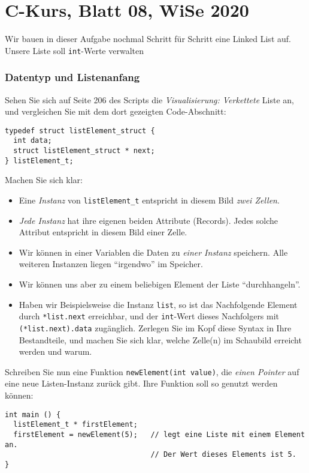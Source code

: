 \documentclass[
	ngerman,
	fontsize=10pt,
	parskip=half,
	titlepage=true,
	DIV=12
]{scrartcl}
\newcommand*{\inC}[1]{\texttt{#1}}
\begin{document}
\part*{C-Kurs, Blatt 08, WiSe 2020}

Wir bauen in dieser Aufgabe nochmal Schritt für Schritt eine Linked List auf. Unsere Liste soll \inC{int}-Werte verwalten

\section{Datentyp und Listenanfang}
Sehen Sie sich auf Seite 206 des Scripts die \emph{Visualisierung: Verkettete} Liste an, und vergleichen Sie mit dem dort gezeigten Code-Abschnitt:
\begin{verbatim}
typedef struct listElement_struct {
  int data;
  struct listElement_struct * next;
} listElement_t;
\end{verbatim}

Machen Sie sich klar:
\begin{itemize}
\item Eine \emph{Instanz} von \texttt{listElement\_t} entspricht in diesem Bild \emph{zwei Zellen}.
\item \emph{Jede Instanz} hat ihre eigenen beiden Attribute (Records). Jedes solche Attribut entspricht in diesem Bild einer Zelle.
\item Wir können in einer Variablen die Daten zu \emph{einer Instanz} speichern. Alle weiteren Instanzen liegen \enquote{irgendwo} im Speicher.
\item Wir können uns aber zu einem beliebigen Element der Liste \enquote{durchhangeln}.
\item Haben wir Beispielsweise die Instanz \texttt{list}, so ist das Nachfolgende Element durch \texttt{*list.next} erreichbar, und der \inC{int}-Wert dieses
	Nachfolgers mit \texttt{(*list.next).data} zugänglich. Zerlegen Sie im Kopf diese Syntax in Ihre Bestandteile, und machen Sie sich klar, welche Zelle(n) im Schaubild
	erreicht werden und warum.
\end{itemize}

Schreiben Sie nun eine Funktion \texttt{newElement(int value)}, die \emph{einen Pointer} auf eine neue Listen-Instanz zurück gibt. Ihre Funktion soll so genutzt werden können:

\begin{verbatim}
int main () {
  listElement_t * firstElement;
  firstElement = newElement(5);   // legt eine Liste mit einem Element an.
                                  // Der Wert dieses Elements ist 5.
}
\end{verbatim}
\end{document}
